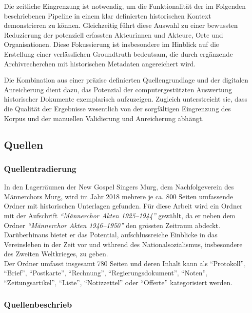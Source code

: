 \documentclass[12pt, a4paper, ngerman, bidi=default]{article}
\begin{document}
Die zeitliche Eingrenzung ist notwendig, um die Funktionalität der im Folgenden beschriebenen Pipeline 
in einem klar definierten historischen Kontext demonstrieren zu können. Gleichzeitig führt diese Auswahl zu einer 
bewussten Reduzierung der potenziell erfassten Akteurinnen und Akteure, Orte und Organisationen. Diese Fokussierung ist 
insbesondere im Hinblick auf die Erstellung einer verlässlichen Groundtruth bedeutsam, die durch ergänzende Archivrecherchen 
mit historischen Metadaten angereichert wird.

Die Kombination aus einer präzise definierten Quellengrundlage und der digitalen Anreicherung dient dazu, das 
Potenzial der computergestützten Auswertung historischer Dokumente exemplarisch aufzuzeigen. 
Zugleich unterstreicht sie, dass die Qualität der Ergebnisse wesentlich von der sorgfältigen Eingrenzung 
des Korpus und der manuellen Validierung und Anreicherung abhängt.

\subsection{Quellen}
\subsubsection{Quellentradierung}
In den Lagerräumen der New Gospel Singers Murg, dem Nachfolgeverein des Männerchors Murg, 
wird im Jahr 2018 mehrere je ca. 800 Seiten umfassende Ordner mit historischen Unterlagen gefunden. 
Für diese Arbeit wird ein Ordner mit der Aufschrift \textit{\enquote{Männerchor Akten 1925--1944}} gewählt, da er neben dem Ordner 
\textit{\enquote{Männerchor Akten 1946--1950}} den grössten Zeitraum abdeckt. Darüberhinaus bietet er das Potential, 
aufschlussreiche Einblicke in das Vereinsleben in der Zeit vor und während des Nationalsozialismus, insbesondere des Zweiten Weltkrieges, zu geben.\\ 
Der Ordner umfasst insgesamt 780 Seiten und deren Inhalt kann als \enquote{Protokoll}, \enquote{Brief}, \enquote{Postkarte}, \enquote{Rechnung}, 
\enquote{Regierungsdokument}, \enquote{Noten}, \enquote{Zeitungsartikel}, \enquote{Liste}, \enquote{Notizzettel} oder \enquote{Offerte} kategorisiert werden.


\subsubsection{Quellenbeschrieb}
\end{document}
